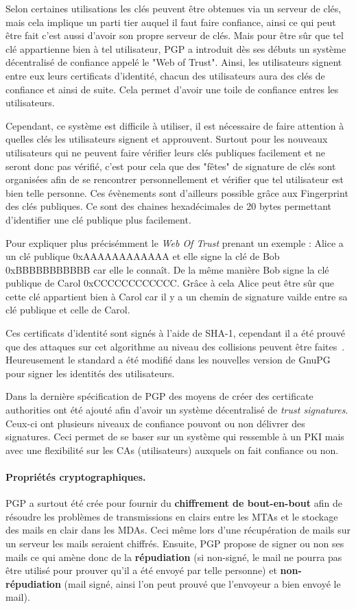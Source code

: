 Selon certaines utilisations les clés peuvent être obtenues via un serveur de clés, mais cela implique un parti tier auquel il faut faire confiance, ainsi ce qui peut être fait c'est aussi d'avoir son propre serveur de clés. Mais pour être sûr que tel clé appartienne bien à tel utilisateur, PGP a introduit dès ses débuts un système décentralisé de confiance appelé le "Web of Trust". Ainsi, les utilisateurs signent entre eux leurs certificats d'identité, chacun des utilisateurs aura des clés de confiance et ainsi de suite. Cela permet d'avoir une toile de confiance entres les utilisateurs.

Cependant, ce système est difficile à utiliser, il est nécessaire de faire attention à quelles clés les utilisateurs signent et approuvent. Surtout pour les nouveaux utilisateurs qui ne peuvent faire vérifier leurs clés publiques facilement et ne seront donc pas vérifié, c'est pour cela que des "fêtes" de signature de clés sont organisées afin de se rencontrer personnellement et vérifier que tel utilisateur est bien telle personne. Ces évènements sont d'ailleurs possible grâce aux Fingerprint des clés publiques. Ce sont des chaines hexadécimales de 20 bytes permettant d'identifier une clé publique plus facilement.

Pour expliquer plus précisémment le \textit{Web Of Trust} prenant un exemple : Alice a un clé publique 0xAAAAAAAAAAAA et elle signe la clé de Bob 0xBBBBBBBBBBB car elle le connaît. De la même manière Bob signe la clé publique de Carol 0xCCCCCCCCCCCC. Grâce à cela Alice peut être sûr que cette clé appartient bien à Carol car il y a un chemin de signature vailde entre sa clé publique et celle de Carol.

Ces certificats d'identité sont signés à l'aide de SHA-1, cependant il a été prouvé que des attaques sur cet algorithme au niveau des collisions peuvent être faites~\cite{DBLP:journals/iacr/LeurentP20}. Heureusement le standard a été modifié dans les nouvelles version de GnuPG pour signer les identités des utilisateurs.

Dans la dernière spécification de PGP des moyens de créer des certificate authorities ont été ajouté afin d'avoir un système décentralisé de \textit{trust signatures}. Ceux-ci ont plusieurs niveaux de confiance pouvont ou non délivrer des signatures. Ceci permet de se baser sur un système qui ressemble à un PKI mais avec une flexibilité sur les CAs (utilisateurs) auxquels on fait confiance ou non.
\paragraph*{Propriétés cryptographiques.}
PGP a surtout été crée pour fournir du \textbf{chiffrement de bout-en-bout} afin de résoudre les problèmes de transmissions en clairs entre les MTAs et le stockage des mails en clair dans les MDAs. Ceci même lors d'une récupération de mails sur un serveur les mails seraient chiffrés. Ensuite, PGP propose de signer ou non ses mails ce qui amène donc de la \textbf{répudiation} (si non-signé, le mail ne pourra pas être utilisé pour prouver qu'il a été envoyé par telle personne) et \textbf{non-répudiation} (mail signé, ainsi l'on peut prouvé que l'envoyeur a bien envoyé le mail).

